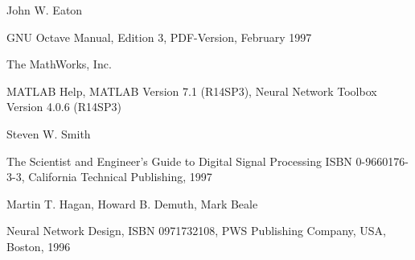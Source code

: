 




%

\begin{thebibliography}{XXXXXXX}

 John W. Eaton

GNU Octave Manual, Edition 3, PDF-Version, February 1997

 The MathWorks, Inc.

MATLAB Help, MATLAB Version 7.1 (R14SP3), Neural Network Toolbox Version 4.0.6 (R14SP3) 

 Steven W. Smith

The Scientist and Engineer's Guide to Digital Signal Processing
ISBN 0-9660176-3-3, California Technical Publishing, 1997

 Martin T. Hagan, Howard B. Demuth, Mark Beale

Neural Network Design, ISBN 0971732108, PWS Publishing Company, USA, Boston, 1996





\end{thebibliography}
%